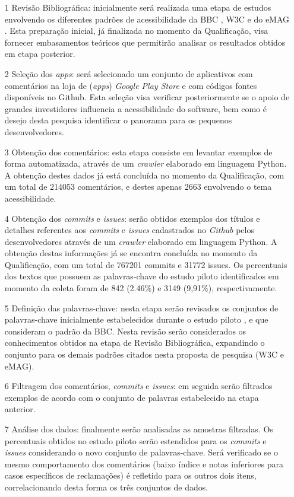 \begin{itemize}
	\item [1] Revisão Bibliográfica: inicialmente será realizada uma etapa de estudos envolvendo os diferentes padrões de acessibilidade da BBC \cite{bbc}, W3C \cite{wcag} e do eMAG \cite{emag}. Esta preparação inicial, já finalizada no momento da Qualificação, visa fornecer embasamentos teóricos que permitirão analisar os resultados obtidos em etapa posterior.
	\item [2] Seleção dos \textit{apps}: será selecionado um conjunto de aplicativos com comentários na loja de (\textit{apps}) \textit{Google Play Store} e com códigos fontes disponíveis no Github. Esta seleção visa verificar posteriormente se o apoio de grandes investidores influencia a acessibilidade do software, bem como é desejo desta pesquisa identificar o panorama para os pequenos desenvolvedores.
	\item [3] Obtenção dos comentários: esta etapa consiste em levantar exemplos de forma automatizada, através de um \textit{crawler} elaborado em linguagem Python. A obtenção destes dados já está concluída no momento da Qualificação, com um total de 214053 comentários, e destes apenas 2663 envolvendo o tema acessibilidade.
	\item [4] Obtenção dos \textit{commits} e \textit{issues}: serão obtidos exemplos dos títulos e detalhes referentes aos \textit{commits} e \textit{issues} cadastrados no \textit{Github} pelos desenvolvedores através de um \textit{crawler} elaborado em linguagem Python. A obtenção destas informações já se encontra concluída no momento da Qualificação, com um total de 767201 commits e 31772 issues.
	Os percentuais dos textos que possuem as palavras-chave do estudo piloto identificados em momento da coleta foram de 842 (2.46\%) e 3149 (9,91\%), respectivamente.
	\item [5] Definição das palavras-chave: nesta etapa serão revisados os conjuntos de palavras-chave inicialmente estabelecidos durante o estudo piloto \cite{ihc2019}, e que consideram o padrão da BBC. Nesta revisão serão considerados os conhecimentos obtidos na etapa de Revisão Bibliográfica, expandindo o conjunto para os demais padrões citados nesta proposta de pesquisa (W3C e eMAG).
	\item [6] Filtragem dos comentários, \textit{commits} e \textit{issues}: em seguida serão filtrados exemplos de acordo com o conjunto de palavras estabelecido na etapa anterior.
	\item [7] Análise dos dados: finalmente serão analisadas as amostras filtradas. Os percentuais obtidos no estudo piloto serão estendidos para os \textit{commits} e \textit{issues} considerando o novo conjunto de palavras-chave. Será verificado se o mesmo comportamento dos comentários (baixo índice e notas inferiores para casos específicos de reclamações) é refletido para os outros dois itens, correlacionando desta forma os três conjuntos de dados.

\end{itemize}
